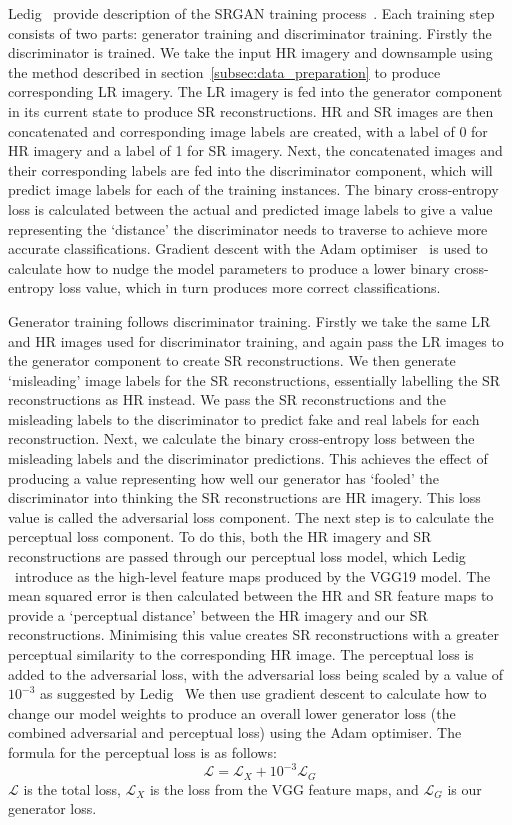 Ledig \etal\ provide description of the SRGAN training process~\cite{srgan}. Each training step consists of two parts: generator training and discriminator training. Firstly the discriminator is trained. We take the input HR imagery and downsample using the method described in section~\ref{subsec:data_preparation} to produce corresponding LR imagery. The LR imagery is fed into the generator component in its current state to produce SR reconstructions. HR and SR images are then concatenated and corresponding image labels are created, with a label of 0 for HR imagery and a label of 1 for SR imagery. Next, the concatenated images and their corresponding labels are fed into the discriminator component, which will predict image labels for each of the training instances. The binary cross-entropy loss is calculated between the actual and predicted image labels to give a value representing the `distance' the discriminator needs to traverse to achieve more accurate classifications. Gradient descent with the Adam optimiser~\cite{adamOptimiser} is used to calculate how to nudge the model parameters to produce a lower binary cross-entropy loss value, which in turn produces more correct classifications.

Generator training follows discriminator training. Firstly we take the same LR and HR images used for discriminator training, and again pass the LR images to the generator component to create SR reconstructions. We then generate `misleading' image labels for the SR reconstructions, essentially labelling the SR reconstructions as HR instead. We pass the SR reconstructions and the misleading labels to the discriminator to predict fake and real labels for each reconstruction. Next, we calculate the binary cross-entropy loss between the misleading labels and the discriminator predictions. This achieves the effect of producing a value representing how well our generator has `fooled' the discriminator into thinking the SR reconstructions are HR imagery. This loss value is called the adversarial loss component. The next step is to calculate the perceptual loss component. To do this, both the HR imagery and SR reconstructions are passed through our perceptual loss model, which Ledig \etal\ introduce as the high-level feature maps produced by the VGG19 model. The mean squared error is then calculated between the HR and SR feature maps to provide a `perceptual distance' between the HR imagery and our SR reconstructions. Minimising this value creates SR reconstructions with a greater perceptual similarity to the corresponding HR image. The perceptual loss is added to the adversarial loss, with the adversarial loss being scaled by a value of $10^{-3}$ as suggested by Ledig \etal\ We then use gradient descent to calculate how to change our model weights to produce an overall lower generator loss (the combined adversarial and perceptual loss) using the Adam optimiser. The formula for the perceptual loss is as follows:
\begin{equation}
    \mathcal{L} = \mathcal{L}_X + 10^{-3}\mathcal{L}_G
\end{equation}
$\mathcal{L}$ is the total loss, $\mathcal{L}_X$ is the loss from the VGG feature maps, and $\mathcal{L}_G$ is our generator loss.


